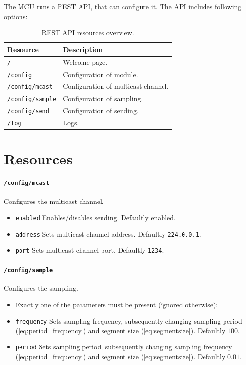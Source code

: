 The MCU runs a REST API, that can configure it. The API includes following options:

\begin{table}[h!]
    \begin{tabular}{|l|l|} \hline
        \textbf{Resource} & \textbf{Description} \\ \hline
        \texttt{/} & Welcome page. \\ \hline
        \texttt{/config} & Configuration of module. \\ \hline
        \texttt{/config/mcast}  & Configuration of multicast channel. \\ \hline
        \texttt{/config/sample} & Configuration of sampling. \\ \hline
        \texttt{/config/send}   & Configuration of sending. \\ \hline
        \texttt{/log}         & Logs. \\ \hline
    \end{tabular}
    \caption{REST API resources overview.}
\end{table}

\section{Resources}

\paragraph{\texttt{/config/mcast}}
Configures the multicast channel.
\begin{itemize}
    \item[] \texttt{enabled} Enables/disables sending. Defaultly enabled.
    \item[] \texttt{address} Sets multicast channel address. Defaultly \texttt{224.0.0.1}.
    \item[] \texttt{port}    Sets multicast channel port. Defaultly \texttt{1234}.
\end{itemize}

\paragraph{\texttt{/config/sample}}
Configures the sampling.
\begin{itemize}
    \item[] Exactly one of the parameters must be present (ignored otherwise):
    \item[] \texttt{frequency} Sets sampling frequency, subsequently changing sampling period (\ref{eq:period_frequency}) and segment size (\ref{eq:segmentsize}). Defaultly $100$.
    \item[] \texttt{period}    Sets sampling period, subsequently changing sampling frequency (\ref{eq:period_frequency}) and segment size (\ref{eq:segmentsize}). Defaultly $0.01$.
\end{itemize}

